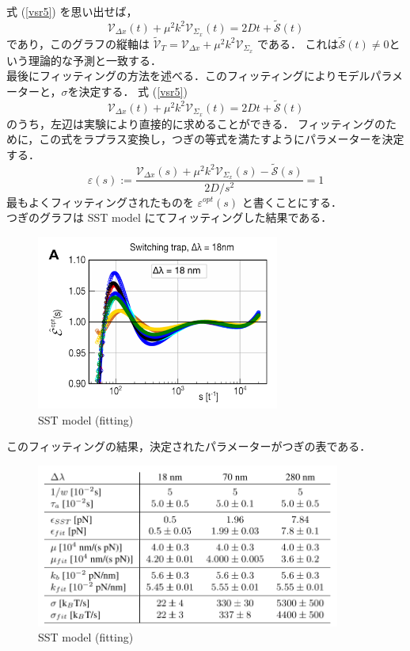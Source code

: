 \documentclass{jsarticle}
\numberwithin{equation}{section}
\theoremstyle{definition}
\begin{document}
式 (\ref{vsr5}) を思い出せば，
\begin{equation}
  \mathcal{V} _{\Delta x} (t) + \mu^2 k^2 \mathcal{V} _{\Sigma_x} (t) = 2Dt + \tilde{\mathcal{S}}(t)
\end{equation}
であり，このグラフの縦軸は $\tilde{\mathcal{V}}_{T} = \mathcal{V} _{\Delta x} + \mu^2 k^2 \mathcal{V} _{\Sigma_x}$ である．
これは$\tilde{\mathcal{S}}(t) \neq 0$という理論的な予測と一致する．\\
\quad 最後にフィッティングの方法を述べる．このフィッティングによりモデルパラメーターと，$\sigma$を決定する．
式 (\ref{vsr5}) 
\begin{equation}
  \mathcal{V} _{\Delta x} (t) + \mu^2 k^2 \mathcal{V} _{\Sigma_x} (t) = 2Dt + \tilde{\mathcal{S}}(t)
\end{equation}
のうち，左辺は実験により直接的に求めることができる．
フィッティングのために，この式をラプラス変換し，つぎの等式を満たすようにパラメーターを決定する．
\begin{equation}
  \varepsilon (s) := \frac{\mathcal{V} _{\Delta x} (s) + \mu^2 k^2 \mathcal{V} _{\Sigma_x} (s) - \tilde{\mathcal{S}}(s)}{2D/s^2} = 1
\end{equation}
最もよくフィッティングされたものを $\varepsilon^{opt} (s)$ と書くことにする．\\
\quad つぎのグラフは SST model にてフィッティングした結果である．

\begin{figure}[H]
  \begin{center}  
  \includegraphics[width=8cm]{vsr_figs2a.png}  
  \end{center}
  \caption{SST model (fitting)}
\end{figure}

このフィッティングの結果，決定されたパラメーターがつぎの表である．

\begin{figure}[H]
  \begin{center}  
  \includegraphics[width=10cm]{vsr_table1.png}  
  \end{center}
  \caption{SST model (fitting)}
\end{figure}
\end{document}
